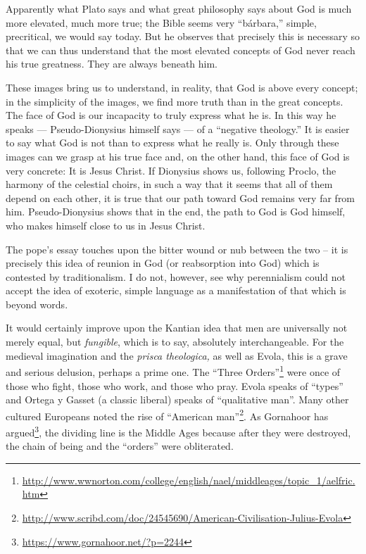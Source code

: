 \begin{quotationx}
Apparently what Plato says and what great philosophy says about God is much more elevated, much more true; the Bible seems very ``bárbara,'' simple, precritical, we would say today. But he observes that precisely this is necessary so that we can thus understand that the most elevated concepts of God never reach his true greatness. They are always beneath him.

These images bring us to understand, in reality, that God is above every concept; in the simplicity of the images, we find more truth than in the great concepts. The face of God is our incapacity to truly express what he is. In this way he speaks --- Pseudo-Dionysius himself says --- of a ``negative theology.'' It is easier to say what God is not than to express what he really is. Only through these images can we grasp at his true face and, on the other hand, this face of God is very concrete: It is Jesus Christ. If Dionysius shows us, following Proclo, the harmony of the celestial choirs, in such a way that it seems that all of them depend on each other, it is true that our path toward God remains very far from him. Pseudo-Dionysius shows that in the end, the path to God is God himself, who makes himself close to us in Jesus Christ.
\end{quotationx}


The pope's essay touches upon the bitter wound or nub between the two -- it is precisely this idea of reunion in God (or reabsorption into God) which is contested by traditionalism. I do not, however, see why perennialism could not accept the idea of exoteric, simple language as a manifestation of that which is beyond words.

It would certainly improve upon the Kantian idea that men are universally not merely equal, but \emph{fungible}, which is to say, absolutely interchangeable. For the medieval imagination and the \emph{prisca theologica,} as well as Evola, this is a grave and serious delusion, perhaps a prime one. The ``Three Orders''\footnote{\url{http://www.wwnorton.com/college/english/nael/middleages/topic\_1/aelfric.htm}} were once of those who fight, those who work, and those who pray. Evola speaks of ``types'' and Ortega y Gasset (a classic liberal) speaks of ``qualitative man''. Many other cultured Europeans noted the rise of ``American man''\footnote{\url{http://www.scribd.com/doc/24545690/American-Civilisation-Julius-Evola}}. As Gornahoor has argued\footnote{\url{https://www.gornahoor.net/?p=2244}}, the dividing line is the Middle Ages because after they were destroyed, the chain of being and the ``orders'' were obliterated.

